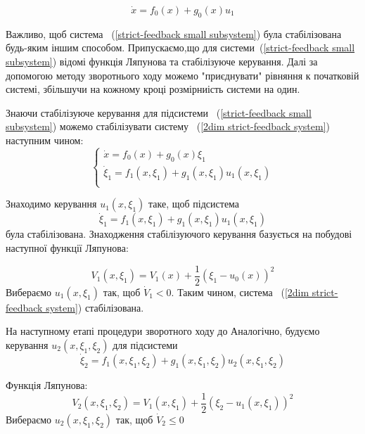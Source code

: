 \documentclass{article}
\begin{document}
\begin{equation} \label{strict-feedback small subsystem}
\dot x = f_0(x)+g_0(x)u_1
\end{equation}

Важливо, щоб система ~(\ref{strict-feedback small subsystem}) була стабілізована будь-яким іншим способом.
Припускаємо,що для системи~(\ref{strict-feedback small subsystem}) 
відомі функція Ляпунова та стабілізуюче керування.
Далі за допомогою методу зворотнього ходу можемо "приєднувати" рівняння к початковій системі, 
збільшучи на кожному кроці розмірниість системи на один. 

Знаючи стабілізуюче керування для підсистеми  ~(\ref{strict-feedback small subsystem})
можемо стабілізувати систему ~(\ref{2dim strict-feedback system}) наступним чином:
\begin{equation} \label{2dim strict-feedback system}
    \begin{cases}
    \dot x = f_0(x)+g_0(x)\xi_1\\
    \dot \xi_1 = f_1(x,\xi_1)+g_1(x,\xi_1)u_1(x,\xi_1)\\
    \end{cases}
\end{equation}

Знаходимо керування $u_1(x,\xi_1)$ таке, щоб підсистема
\begin{equation}
    \dot \xi_1 = f_1(x,\xi_1)+g_1(x,\xi_1)u_1(x,\xi_1)
\end{equation}
була стабілізована. Знаходження стабілізуючого керування базується на побудові наступної функції Ляпунова:

\begin{equation}
V_{1}(x,\xi_1)=V_{1}(x)+{\frac{1}{2}}(\xi_1-u_{0}(x))^{2}
\end{equation}
Вибераємо $u_1(x,\xi_1)$ так, щоб $\dot V_{1} < 0$.
Таким чином, система ~(\ref{2dim strict-feedback system}) стабілізована.

На наступному етапі процедури зворотного ходу до  
Аналогічно, будуємо керування $u_{2}(x,\xi_{1},\xi_{2})$
для підсистеми 
\begin{equation*}
    \dot \xi_2 = f_1(x,\xi_1,\xi_2)+g_1(x, \xi_1, \xi_2)u_2(x,\xi_1, \xi_2)
\end{equation*} 

Функція Ляпунова:
\begin{equation*}
    V_{2}(x,\xi_{1}, \xi_{2})=V_{1}(x,\xi_{1})+{\frac {1}{2}}(\xi_{2}-u_{1}(x,\xi_{1}))^{2}
\end{equation*}
Вибераємо $u_2(x,\xi_1, \xi_2)$ так, щоб $\dot V_{2} \le 0$
\end{document}
